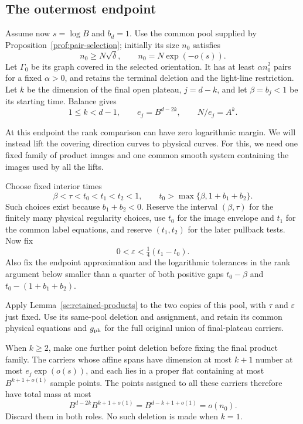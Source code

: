 \subsection{The outermost endpoint}

Assume now $s=\log B$ and $b_d=1$.  Use the common pool supplied by
Proposition~\ref{prof:pair-selection}; initially its size $n_0$ satisfies
\begin{equation}\label{sc:outer-pool}
 n_0\ge N\sqrt\delta,\qquad n_0=N\exp(-o(s)).
\end{equation}
Let $\Gamma_0$ be its graph covered in the selected orientation.  It has
at least $\alpha n_0^2$ pairs for a fixed $\alpha>0$, and retains the
terminal deletion and the light-line restriction.  Let $k$ be the
dimension of the final open plateau, $j=d-k$, and let $\beta=b_j<1$
be its starting time.  Balance gives
\begin{equation}\label{sc:outer-budgets}
 1\le k<d-1,\qquad e_j=B^{d-2k},\qquad N/e_j=A^k.
\end{equation}

At this endpoint the rank comparison can have zero logarithmic margin.
We will instead lift the covering direction curves to physical curves.
For this, we need one fixed family of product images and one common
smooth system containing the images used by all the lifts.

Choose fixed interior times
\begin{equation}\label{sc:outer-time-choice}
 \beta<\tau<t_0<t_1<t_2<1,
 \qquad t_0>\max\{\beta,1+b_1+b_2\}.
\end{equation}
Such choices exist because $b_1+b_2<0$.  Reserve the interval
$(\beta,\tau)$ for the finitely many physical regularity choices,
use $t_0$ for the image envelope and $t_1$ for the common label equations,
and reserve $(t_1,t_2)$ for the later pullback tests.  Now fix
\[
 0<\varepsilon<\tfrac14(t_1-t_0).
\]
Also fix the endpoint approximation and the logarithmic tolerances in
the rank argument below smaller than a quarter of both positive gaps
$t_0-\beta$ and $t_0-(1+b_1+b_2)$.

Apply Lemma~\ref{sc:retained-products} to the two copies of this pool,
with $\tau$ and $\varepsilon$ just fixed.  Use its same-pool deletion
and assignment, and retain its common physical equations and
$g_{\rm ph}$ for the full original union of final-plateau carriers.

When $k\ge2$, make one further point deletion before fixing the final
product family.  The carriers whose affine spans have dimension at most
$k+1$ number at most $e_j\exp(o(s))$, and each lies in a proper flat
containing at most $B^{k+1+o(1)}$ sample points.  The points assigned to
all these carriers therefore have total mass at most
\[
 B^{d-2k}B^{k+1+o(1)}=B^{d-k+1+o(1)}=o(n_0).
\]
Discard them in both roles.  No such deletion is made when $k=1$.

